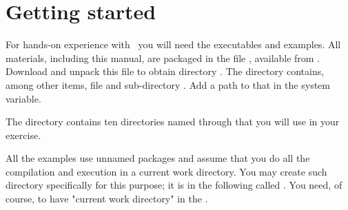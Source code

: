 
\section{Getting started}


For hands-on experience with \Mouse\ you will need the executables
and examples.\newline
All materials, including this manual, 
are packaged in the  file ,
available from\linebreak
{}.
Download and unpack this file to obtain directory\linebreak
{}.
The directory contains, among other items,
 file  and sub-directory\linebreak
{}. 
Add a path to that  in the  system variable.

The  directory contains
ten directories named  through 
that you will use in your exercise.

All the examples use unnamed packages and assume that you
do all the compilation and execution in a current work directory.
You may create such directory specifically for this purpose;
it is in the following called .
You need, of course, to have "current work directory" 
in the .
